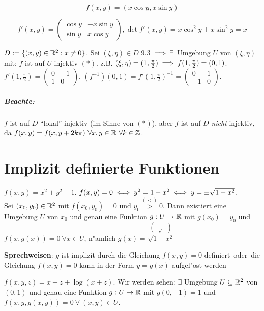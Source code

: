 \documentclass[a4paper,twoside,DIV15,BCOR12mm]{scrbook}
\begin{document}
\begin{beispiel}

$$f(x,y) = (x \cos y, x \sin y)$$

$$f'(x,y) = \begin{pmatrix} \cos y & -x \sin y \\ \sin y & x \cos y \end{pmatrix}, \det f'(x,y) = x \cos^2 y + x \sin^2 y = x$$

$D:=\{(x,y) \in \mathbb{R}^2: x\ne 0\}$. Sei $(\xi, \eta)\in D$ 9.3 $\implies \exists$ Umgebung $U$ von $(\xi, \eta)$ mit: $f$ ist auf $U$ injektiv $(*)$. z.B. $(\xi, \eta) = (1, \frac{\pi}{2}) \implies f(1,\frac{\pi}2) = (0,1)$. $f'(1,\frac{\pi}2) = \begin{pmatrix}0 & -1 \\ 1 & 0 \end{pmatrix}$, $(f^{-1})(0,1) = f'(1,\frac{\pi}{2})^{-1} = \begin{pmatrix}0 & 1 \\ -1 & 0\end{pmatrix}$.

\end{beispiel}

\paragraph{Beachte:} $f$ ist auf $D$ "`lokal"'   injektiv (im Sinne von $(*)$), aber $f$ ist auf $D$ \emph{nicht} injektiv, da $f(x,y) = f(x,y+2 k\pi) \ \forall x,y\in\mathbb{R} \ \forall k\in\mathbb{Z}$.

\chapter{Implizit definierte Funktionen}
\def\grad{\mathop{\rm grad}\nolimits}
\def\MdU{\ensuremath{\mathbb{U}}}

\begin{beispiele}
\item $f(x,y)=x^2+y^2-1$. $f(x,y)=0\iff y^2=1-x^2\iff y=\pm\sqrt{1-x^2}$. \\
Sei $(x_0, y_0)\in\mathbb{R}^2$ mit $f(x_0, y_0)=0$ und $y_0\overset{(<)}{>}0$. Dann existiert eine Umgebung $U$ von $x_0$ und genau eine Funktion $g:U\to\mathbb{R}$ mit $g(x_0)=y_0$ und $f(x,g(x))=0\ \forall x \in U$, n"amlich $g(x)=\overset{(-\sqrt{\cdots})}{\sqrt{1-x^2}}$

\textbf{Sprechweisen}: \glqq $g$ ist implizit durch die Gleichung $f(x,y)=0$ definiert\grqq\ oder\ \glqq die Gleichung $f(x,y)=0$ kann in der Form $y=g(x)$ aufgel"ost werden\grqq

\item $f(x,y,z)=x+z+\log(x+z)$. Wir werden sehen: $\exists$ Umgebung $U\subseteq \mathbb{R}^2$ von $(0,1)$ und genau eine Funktion $g:U\to\mathbb{R}$ mit $g(0,-1)=1$ und $f(x,y,g(x,y))=0\ \forall\ (x,y)\in U$.
\end{beispiele}
\end{document}
